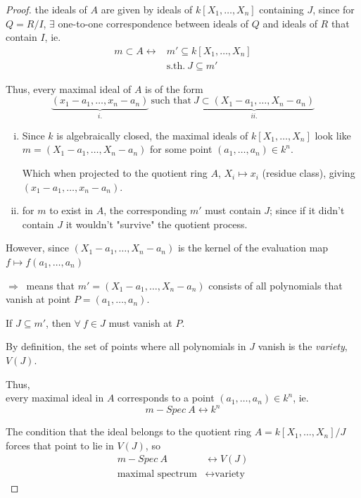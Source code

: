 \documentclass{article}
\theoremstyle{definition}
\begin{document}
\begin{proof}
  the ideals of $A$ are given by ideals of $k[X_1, \ldots, X_n]$ containing $J$, since for $Q=R/I$, $\exists$ one-to-one correspondence between ideals of $Q$ and ideals of $R$ that contain $I$, ie.
  \begin{align*}
    m \subset A \longleftrightarrow &m' \subseteq k[X_1, \ldots, X_n]\\
                &\text{s.th.}~ J \subseteq m'
  \end{align*}

  Thus, every maximal ideal of $A$ is of the form
  $$\underbrace{(x_1 -a_1, \ldots, x_n - a_n)}_{i.} ~\text{such that}~ \underbrace{J \subset (X_1 - a_1, \ldots, X_n - a_n)}_{ii.}$$

  \begin{enumerate}[i.]
    \item Since $k$ is algebraically closed, the maximal ideals of $k[X_1, \ldots, X_n]$ look like $m=(X_1 - a_1, \ldots, X_n - a_n)$ for some point $(a_1, \ldots, a_n) \in k^n$.

      Which when projected to the quotient ring $A$, $X_i \longmapsto x_i$ (residue class), giving $(x_1 - a_1, \ldots, x_n - a_n)$.
      
    \item for $m$ to exist in $A$, the corresponding $m'$ must contain $J$; since if it didn't contain $J$ it wouldn't "survive" the quotient process.
  \end{enumerate}

  \vspace{0.3cm}
  However, since $(X_1 - a_1, \ldots, X_n - a_n)$ is the kernel of the evaluation map $f \longmapsto f(a_1, \ldots, a_n)$

  $\Longrightarrow~$ means that $m'=(X_1 - a_1, \ldots, X_n - a_n)$ consists of all polynomials that vanish at point $P=(a_1, \ldots, a_n)$.

  If $J \subseteq m'$, then $\forall~ f \in J$ must vanish at $P$.

  By definition, the set of points where all polynomials in $J$ vanish is the \emph{variety}, $V(J)$.

  \vspace{0.4cm}
  Thus,\\
  every maximal ideal in $A$ corresponds to a point $(a_1, \ldots, a_n) \in k^n$, ie.
  $$m-Spec~ A \longleftrightarrow k^n$$

  The condition that the ideal belongs to the quotient ring $A=k[X_1, \ldots, X_n]/J$ forces that point to lie in $V(J)$, so
  \begin{align*}
    m-Spec~ A &\longleftrightarrow V(J)\\
    \text{maximal spectrum} &\longleftrightarrow \text{variety}
  \end{align*}
\end{proof}
\end{document}
